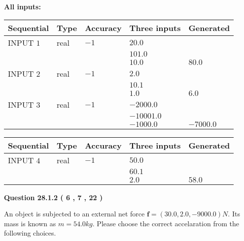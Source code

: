 \documentclass[12pt]{article}
\begin{document}
   
   
   
\noindent\vspace{0.1in}\hspace{-0.08in} {\textbf{\Large{All inputs: }}}
   
   
  
  
\noindent\begin{tabular}{|l|l|l|l|l|}
\hline
 Sequential & Type & Accuracy & Three inputs & Generated \\ 
\hline
 
 
  INPUT $            1 $ & real & $           -1  $ & $
 20.0
  $ & \\
  & & &  $
 101.0
  $ & \\
  & & &  $
 10.0
 $ & $ 80.0 $ 
 \\  \hline  
 
 
  INPUT $            2 $ & real & $           -1  $ & $
 2.0
  $ & \\
  & & &  $
 10.1
  $ & \\
  & & &  $
 1.0
 $ & $ 6.0 $ 
 \\  \hline  
 
 
  INPUT $            3 $ & real & $           -1  $ & $
 -2000.0
  $ & \\
  & & &  $
 -10001.0
  $ & \\
  & & &  $
 -1000.0
 $ & $ -7000.0 $ 
 \\  \hline  
 \end{tabular}
   
   
  
  
\noindent\begin{tabular}{|l|l|l|l|l|}
\hline
 Sequential & Type & Accuracy & Three inputs & Generated \\ 
\hline
 
 
  INPUT $            4 $ & real & $           -1  $ & $
 50.0
  $ & \\
  & & &  $
 60.1
  $ & \\
  & & &  $
 2.0
 $ & $ 58.0 $ 
 \\  \hline  
 \end{tabular}
   
   
  
\vspace{0.2in}
  
{\textbf{\Large{Question
28.1.2 
 (           6 ,           7 ,          22 )
}}}
  
  
 
An object is subjected to an external net force $\mathbf{f}=(
30.0 ,
2.0,
-9000.0  )N$. Its mass is known as
$m= %
54.0  kg$. Please choose the correct accelaration
from the following choices.
 
\end{document}

